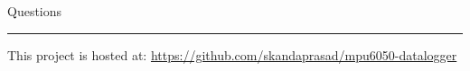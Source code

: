 \documentclass[aspectratio=169,xcolor=dvipsnames]{beamer}
\begin{document}
\begin{frame}
    \Huge{\centerline{Questions}}
    \vspace{1cm}
    \hrule
    \vspace{1cm}
    {\large \centerline{This project is hosted at: \url{https://github.com/skandaprasad/mpu6050-datalogger}}}
\end{frame}
\end{document}
